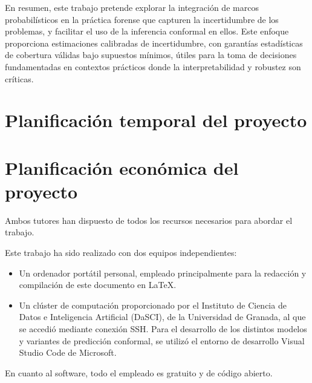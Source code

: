 En resumen, este trabajo pretende explorar la integración de marcos probabilísticos en la práctica forense
que capturen la incertidumbre de los problemas, y facilitar el uso de la inferencia conformal en ellos. 
Este enfoque proporciona estimaciones calibradas de incertidumbre, con garantías estadísticas de cobertura 
válidas bajo supuestos mínimos, útiles para la toma de decisiones fundamentadas en contextos prácticos 
donde la interpretabilidad y robustez son críticas.


\section{Planificación temporal del proyecto}



\section{Planificación económica del proyecto}

Ambos tutores han dispuesto de todos los recursos necesarios para abordar el trabajo. 

Este trabajo ha sido realizado con dos equipos independientes: 

\begin{itemize}

    \item Un ordenador portátil personal, empleado principalmente para la redacción y compilación de este 
    documento en \LaTeX.
        
    \item Un clúster de computación proporcionado por el Instituto de Ciencia de Datos e Inteligencia 
    Artificial (DaSCI), de la Universidad de Granada, al que se accedió mediante conexión SSH. Para el 
    desarrollo de los distintos modelos y variantes de predicción conformal, se utilizó el entorno de 
    desarrollo Visual Studio Code de Microsoft.

\end{itemize}


En cuanto al software, todo el empleado es gratuito y de código abierto. 


